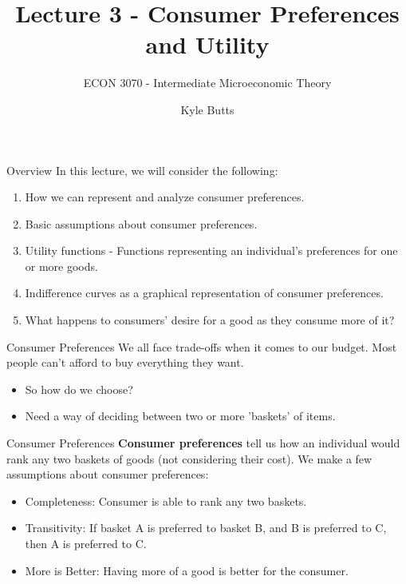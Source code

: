 \documentclass[11pt,t]{beamer}
\author{Kyle Butts}
\title{Lecture 3 - Consumer Preferences and Utility}
\subtitle{ECON 3070 - Intermediate Microeconomic Theory}
\begin{document}
\begin{frame}
\titlepage
\end{frame}

\begin{frame}{Overview}
  In this lecture, we will consider the following:
  \begin{enumerate}
    \item How we can represent and analyze consumer preferences.
    \item Basic assumptions about consumer preferences.
    \item Utility functions  - Functions representing an individual's preferences for one or more goods.
    \item Indifference curves as a graphical representation of consumer preferences.
    \item What happens to consumers' desire for a good as they consume more of it?
  \end{enumerate}
\end{frame}

\begin{frame}{Consumer Preferences}
  We all face trade-offs when it comes to our budget. Most people can't afford to buy everything they want.

  \begin{itemize}
    \item So how do we choose?

    \item Need a way of deciding between two or more 'baskets' of items.
  \end{itemize}
\end{frame}

\begin{frame}{Consumer Preferences}
  \textbf{Consumer preferences} tell us how an individual would rank any two baskets of goods (not considering their cost). We make a few assumptions about consumer preferences:

  \bigskip
  \begin{itemize}
    \item Completeness: Consumer is able to rank any two baskets.
    \item Transitivity: If basket A is preferred to basket B, and B is preferred to C, then A is preferred to C.
    \item More is Better: Having more of a good is better for the consumer.
  \end{itemize}
\end{frame}
\end{document}
